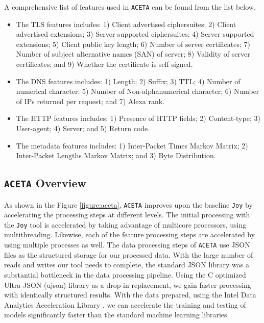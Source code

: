 A comprehensive list of features used in \texttt{ACETA} can be found from the list below.

\begin{itemize}
	\item
	The TLS features includes:
	1) Client advertised ciphersuites;
	2) Client advertised extensions;
	3) Server supported ciphersuites;
	4) Server supported extensions;
	5) Client public key length;
	6) Number of server certificates;
	7) Number of subject alternative names (SAN) of server;
	8) Validity of server certificates; and
	9) Whether the certificate is self signed.
	\item
	The DNS features includes: 
	1) Length;
	2) Suffix;
	3) TTL;
	4) Number of numerical character;
	5) Number of Non-alphanumerical character;
	6) Number of IPs returned per request; and
	7) Alexa rank.
	\item
	The HTTP features includes:
	1) Presence of HTTP fields;
	2) Content-type;
	3) User-agent;
	4) Server; and
	5) Return code.
	
	\item
	The metadata features includes: 
	1) Inter-Packet Times Markov Matrix;
	2) Inter-Packet Lengths Markov Matrix; and
	3) Byte Distribution.
\end{itemize}

\subsection{\texttt{ACETA} Overview}

As shown in the Figure \ref{figure:aceta}, \texttt{ACETA} improves upon the baseline \texttt{Joy} by accelerating the processing steps at different levels. The initial processing with the \texttt{Joy} tool is accelerated by taking advantage of multicore processors, using multithreading. Likewise, each of the feature processing steps are accelerated by using multiple processes as well. The data processing steps of \texttt{ACETA} use JSON files as the structured storage for our processed data. With the large number of reads and writes our tool needs to complete, the standard JSON library was a substantial bottleneck in the data processing pipeline. Using the C optimized Ultra JSON (ujson) library as a drop in replacement, we gain faster processing with identically structured results. With the data prepared, using the Intel Data Analytics Acceleration Library \cite{daal}, we can accelerate the training and testing of models significantly faster than the standard machine learning libraries.

